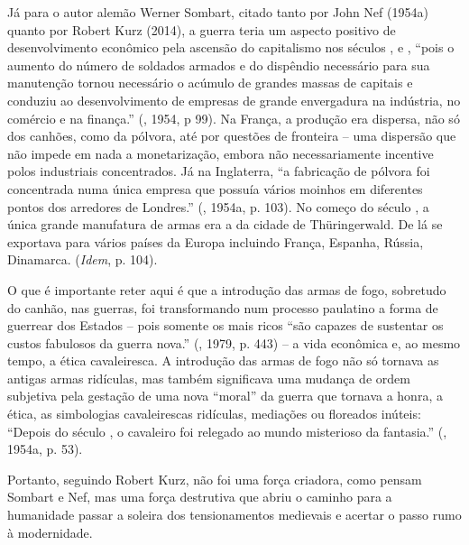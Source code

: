 Já para o autor alemão Werner Sombart, citado tanto por John Nef (1954a)
quanto por Robert Kurz (2014), a guerra teria um aspecto positivo de
desenvolvimento econômico pela ascensão do capitalismo nos séculos ,
 e , ``pois o aumento do número de soldados armados e do
dispêndio necessário para sua manutenção tornou necessário o acúmulo de
grandes massas de capitais e conduziu ao desenvolvimento de empresas de
grande envergadura na indústria, no comércio e na finança.'' (, 1954,
p 99). Na França, a produção era dispersa, não só dos canhões, como da
pólvora, até por questões de fronteira -- uma dispersão que não impede
em nada a monetarização, embora não necessariamente incentive polos
industriais concentrados. Já na Inglaterra, ``a fabricação de pólvora
foi concentrada numa única empresa que possuía vários moinhos em
diferentes pontos dos arredores de Londres.'' (, 1954a, p. 103). No
começo do século , a única grande manufatura de armas era a da
cidade de Thüringerwald. De lá se exportava para vários países da Europa
incluindo França, Espanha, Rússia, Dinamarca. (\emph{Idem}, p. 104).

O que é importante reter aqui é que a introdução das armas de fogo,
sobretudo do canhão, nas guerras, foi transformando num processo
paulatino a forma de guerrear dos Estados -- pois somente os mais ricos
``são capazes de sustentar os custos fabulosos da guerra nova.''
(, 1979, p. 443) -- a vida econômica e, ao mesmo tempo, a ética
cavaleiresca. A introdução das armas de fogo não só tornava as antigas
armas ridículas, mas também significava uma mudança de ordem subjetiva
pela gestação de uma nova ``moral'' da guerra que tornava a honra, a
ética, as simbologias cavaleirescas ridículas, mediações ou floreados
inúteis: ``Depois do século , o cavaleiro foi relegado ao mundo
misterioso da fantasia.'' (, 1954a, p. 53).

Portanto, seguindo Robert Kurz, não foi uma força criadora, como pensam
Sombart e Nef, mas uma força destrutiva que abriu o caminho para a
humanidade passar a soleira dos tensionamentos medievais e acertar o
passo rumo à modernidade.

